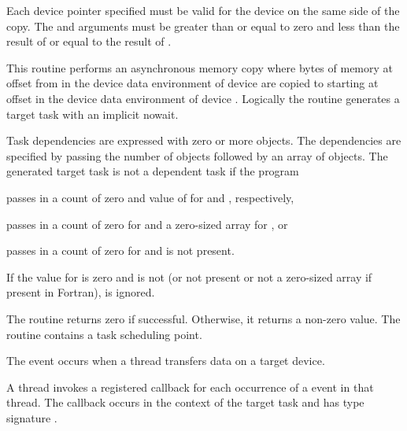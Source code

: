 \constraints
Each device pointer specified must be valid for the device on the same side
of the copy. The  and
 arguments must be greater than or equal to zero and
less than the result of  or equal to
the result of .

\effect
This routine performs an asynchronous memory copy where
 bytes of memory at offset  from 
in the device data environment of device  are
copied to  starting at offset  in the device data
environment of device .
Logically the  routine generates a target task with an implicit nowait.

Task dependencies are expressed with zero or more 
objects. The dependencies are specified by passing the
number of  objects followed by an array of
 objects.  The generated target task is not a
dependent task if the program
\begin{itemize}
\begin{ccppspecific}
\item passes in a count of zero and value of  for
 and , respectively,
\end{ccppspecific}

\begin{fortranspecific}
\item passes in a count of zero for  and a zero-sized array for , or
\item passes in a count of zero for  and  is not present.
\end{fortranspecific}
\end{itemize}

If the value for  is zero and 
 is not  (or not present or not a
zero-sized array if present in Fortran),  is
ignored.

The routine returns zero if successful.
Otherwise, it returns a non-zero value. The
routine contains a task scheduling point.

\events
The  event occurs when a thread transfers data on a target device.

\tools
A thread invokes a registered 
callback for each occurrence of a  event in that
thread. The callback occurs in the context of the target task and has
type signature .

